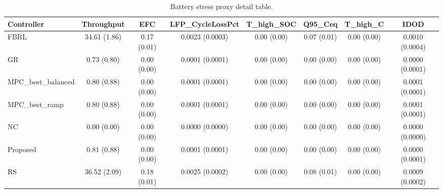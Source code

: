 \begin{table}[t]
\centering
\caption{Battery stress proxy detail table.}
\label{tab:stress_proxy_auto}
\begin{tabular}{lccccccc}
\toprule
Controller & Throughput & EFC & LFP\_CycleLossPct & T\_high\_SOC & Q95\_Ceq & T\_high\_C & IDOD \\
\midrule
FBRL & 34.61 (1.86) & 0.17 (0.01) & 0.0023 (0.0003) & 0.00 (0.00) & 0.07 (0.01) & 0.00 (0.00) & 0.0010 (0.0004) \\
GR & 0.73 (0.80) & 0.00 (0.00) & 0.0001 (0.0001) & 0.00 (0.00) & 0.00 (0.00) & 0.00 (0.00) & 0.0000 (0.0001) \\
MPC\_best\_balanced & 0.80 (0.88) & 0.00 (0.00) & 0.0001 (0.0001) & 0.00 (0.00) & 0.00 (0.00) & 0.00 (0.00) & 0.0001 (0.0001) \\
MPC\_best\_ramp & 0.80 (0.88) & 0.00 (0.00) & 0.0001 (0.0001) & 0.00 (0.00) & 0.00 (0.00) & 0.00 (0.00) & 0.0001 (0.0001) \\
NC & 0.00 (0.00) & 0.00 (0.00) & 0.0000 (0.0000) & 0.00 (0.00) & 0.00 (0.00) & 0.00 (0.00) & 0.0000 (0.0000) \\
Proposed & 0.81 (0.88) & 0.00 (0.00) & 0.0001 (0.0001) & 0.00 (0.00) & 0.00 (0.00) & 0.00 (0.00) & 0.0000 (0.0001) \\
RS & 36.52 (2.09) & 0.18 (0.01) & 0.0025 (0.0002) & 0.00 (0.00) & 0.08 (0.01) & 0.00 (0.00) & 0.0009 (0.0002) \\
\bottomrule
\end{tabular}
\end{table}